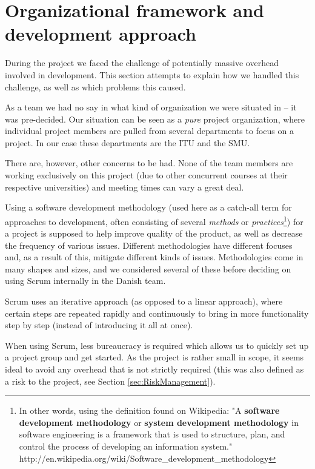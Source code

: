 \section{Organizational framework and development approach}
\label{sec:EmpiriOrganizational}
\label{sec:organizational}

During the project we faced the challenge of potentially massive overhead involved in development.
This section attempts to explain how we handled this challenge, as well as which problems this
caused.

As a team we had no say in what kind of organization we were situated in – it was pre-decided. Our
situation can be seen as a \emph{pure} project organization\cite[ch.~4.2]{caye}, where individual project members are
pulled from several departments to focus on a project. In our case these departments are the
ITU and the SMU.

There are, however, other concerns to be had. None of the team members are working exclusively
on this project (due to other concurrent courses at their respective universities) and meeting
times can vary a great deal.

Using a software development methodology (used here as a catch-all term for approaches to
development, often consisting of several \emph{methods} or \emph{practices}\footnote{In other
words, using the definition found on Wikipedia: "A \textbf{software development methodology}
or \textbf{system development methodology} in software engineering is a framework that is used
to structure, plan, and control the process of developing an information system."
http://en.wikipedia.org/wiki/Software_development_methodology}) for a project is supposed to help
improve quality of the product, as well as decrease the frequency of various issues. Different
methodologies have different focuses and, as a result of this, mitigate different kinds of issues.
Methodologies come in many shapes and sizes, and we considered several of these before deciding
on using Scrum internally in the Danish team.

Scrum uses an iterative approach (as opposed to a linear approach), where certain steps are
repeated rapidly and continuously to bring in more functionality step by step (instead of
introducing it all at once).

When using Scrum, less bureaucracy is required\cite[ch.~6]{caye} which allows us to quickly set up a project
group and get started. As the project is rather small in scope, it seems ideal to avoid any overhead
that is not strictly required (this was also defined as a risk to the project, see Section \ref{sec:RiskManagement}).

